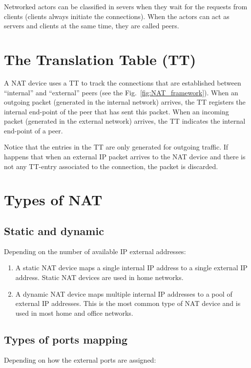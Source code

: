 Networked actors can be classified in severs when they wait for the
requests from clients (clients always initiate the connections). When
the actors can act as servers and clients at the same time, they are
called peers.

\section{The Translation Table (TT)}

A NAT device uses a TT to track the connections that are established
between ``internal'' and ``external'' peers (see the
Fig.~\ref{fig:NAT_framework}). When an outgoing packet (generated in
the internal network) arrives, the TT registers the internal end-point
of the peer that has sent this packet. When an incoming packet
(generated in the external network) arrives, the TT indicates the
internal end-point of a peer.

Notice that the entries in the TT are only generated for outgoing
traffic. If happens that when an external IP packet arrives to the NAT
device and there is not any TT-entry associated to the connection, the
packet is discarded.

\section{Types of NAT}

\subsection{Static and dynamic}

Depending on the number of available IP external addresses:

\begin{enumerate}
\item A static NAT device maps a single internal IP address to a
  single external IP address. Static NAT devices are used in home
  networks.
\item A dynamic NAT device maps multiple internal IP addresses to a
  pool of external IP addresses. This is the most common type of NAT
  device and is used in most home and office networks.
\end{enumerate}

\subsection{Types of ports mapping}

Depending on how the external ports are assigned:

